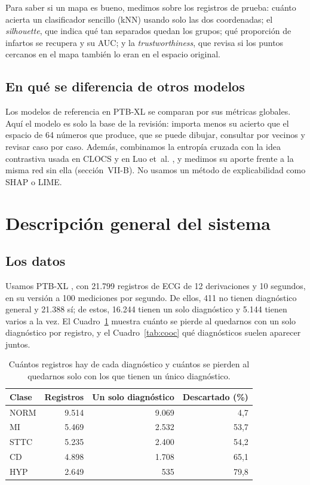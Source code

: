 \documentclass[conference]{IEEEtran}
\begin{document}
Para saber si un mapa es bueno, medimos sobre los registros de prueba: cuánto acierta un clasificador sencillo (kNN) usando solo las dos coordenadas; el \emph{silhouette}, que indica qué tan separados quedan los grupos; qué proporción de infartos se recupera y su AUC; y la \emph{trustworthiness}, que revisa si los puntos cercanos en el mapa también lo eran en el espacio original.

\subsection{En qué se diferencia de otros modelos}
Los modelos de referencia en PTB-XL \cite{strodthoff} se comparan por sus métricas globales. Aquí el modelo es solo la base de la revisión: importa menos su acierto que el espacio de 64 números que produce, que se puede dibujar, consultar por vecinos y revisar caso por caso. Además, combinamos la entropía cruzada con la idea contrastiva usada en CLOCS \cite{kiyasseh} y en Luo et~al. \cite{luo}, y medimos su aporte frente a la misma red sin ella (sección~VII-B). No usamos un método de explicabilidad como SHAP o LIME.

\section{Descripción general del sistema}

\subsection{Los datos}
Usamos PTB-XL \cite{wagner}, con 21.799 registros de ECG de 12 derivaciones y 10 segundos, en su versión a 100 mediciones por segundo. De ellos, 411 no tienen diagnóstico general y 21.388 sí; de estos, 16.244 tienen un solo diagnóstico y 5.144 tienen varios a la vez. El Cuadro~\ref{tab:clases} muestra cuánto se pierde al quedarnos con un solo diagnóstico por registro, y el Cuadro~\ref{tab:cooc} qué diagnósticos suelen aparecer juntos.

\begin{table}[t]
\centering
\caption{Cuántos registros hay de cada diagnóstico y cuántos se pierden al quedarnos solo con los que tienen un único diagnóstico.}
\label{tab:clases}
\small
\begin{tabular}{lrrr}
\toprule
Clase & Registros & Un solo diagnóstico & Descartado (\%) \\
\midrule
NORM & 9.514 & 9.069 & 4,7 \\
MI   & 5.469 & 2.532 & 53,7 \\
STTC & 5.235 & 2.400 & 54,2 \\
CD   & 4.898 & 1.708 & 65,1 \\
HYP  & 2.649 & 535   & 79,8 \\
\bottomrule
\end{tabular}
\end{table}
\end{document}
